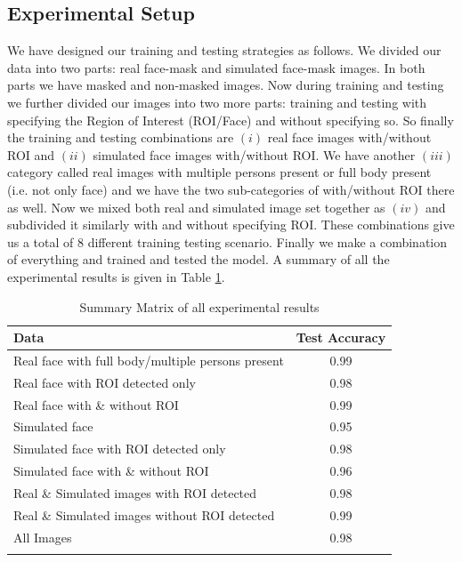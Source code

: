 \documentclass{svproc}
\begin{document}
\subsection{Experimental Setup}

We have designed our training and testing strategies as follows. We divided our data into two parts: real face-mask and simulated face-mask images. In both parts we have masked and non-masked images. Now during training and testing we further divided our images into two more parts: training and testing with specifying the Region of Interest (ROI/Face) and without specifying so. So finally the training and testing combinations are $(i)$ real face images with/without ROI and $(ii)$ simulated face images with/without ROI. We have another $(iii)$ category called real images with multiple persons present or full body present (i.e. not only face) and we have the two sub-categories of with/without ROI there as well. Now we mixed both real and simulated image set together as $(iv)$ and subdivided it similarly with and without specifying ROI. These combinations give us a total of 8 different training testing scenario. Finally we make a combination of everything and trained and tested the model. A summary of all the experimental results is given in Table \ref{expResult}.

\begin{table}[]
\centering
\begin{tabular}{lc}
\hline
Data & Test Accuracy \\
\hline
Real face with full body/multiple persons present & 0.99 \\
Real face with ROI detected only                       & 0.98 \\
Real face with \& without ROI                      & 0.99 \\
Simulated face                  & 0.95 \\
Simulated face with ROI detected  only            & 0.98 \\
Simulated face with \& without ROI       & 0.96 \\
Real \& Simulated images with ROI detected           & 0.98 \\
Real \& Simulated images without ROI detected                 & 0.99 \\
All Images                         & 0.98 \\
\hline \\
\end{tabular}
\caption{Summary Matrix of all experimental results}
\label{expResult}
\end{table}
\end{document}
